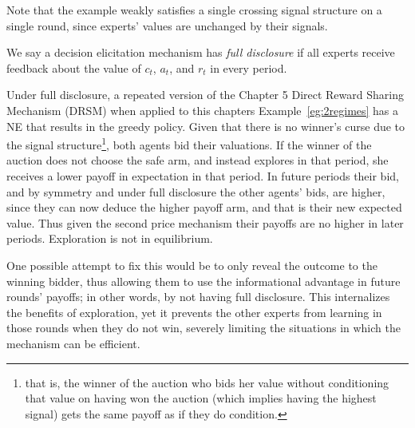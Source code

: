 Note that the example weakly satisfies a single crossing signal structure on a single round, since experts' values are unchanged by their signals.

\begin{defn}
  We say a decision elicitation mechanism has \emph{full disclosure} if all experts receive feedback about the value of $c_t$, $a_t$, and $r_t$ in every period.
 \end{defn}


Under full disclosure, a repeated version of the Chapter 5 Direct Reward Sharing Mechanism (DRSM) when applied to this chapters Example~\ref{eg:2regimes} has a NE that results in the greedy policy. %
Given that there is no winner's curse due to the signal structure\footnote{that is, the winner of the auction who  bids her value without conditioning that value on having won the auction (which implies having the highest signal) gets the same payoff as if they do condition.}, both agents bid their valuations. %
If the winner of the auction does not choose the safe arm, and instead explores in that period, she receives a lower payoff in expectation in that period. In future periods their bid, and by symmetry and under full disclosure the other agents' bids, are higher, since they can now deduce the higher payoff arm, and that is their new expected value. Thus given the second price mechanism their payoffs are no higher in later periods. Exploration is not in equilibrium. 


One possible attempt to fix this would be to only reveal the outcome to the winning bidder, thus allowing them to use the informational advantage in future rounds' payoffs; in other words, by not having full disclosure.
This internalizes the benefits of exploration, yet it prevents the other experts from learning in those rounds when they do not win, severely limiting the situations in which the mechanism can be efficient.




